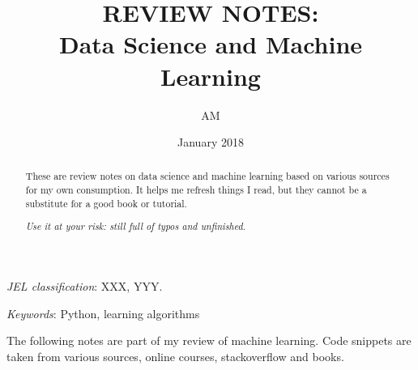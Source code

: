 \documentclass[11pt]{article}
\begin{document}


\title{REVIEW NOTES: \\
	Data Science and Machine Learning    
	}


\author{AM %
        }

\date{January 2018}  %


\renewcommand{\thefootnote}{\fnsymbol{footnote}}   

\singlespacing

\maketitle

\vspace{-.2in}
\begin{abstract}
\noindent These are review notes on data science and machine learning based on various sources for my own consumption. It helps me refresh things I read, but they cannot be a substitute for a good book or tutorial.

\centering\textit{Use it at your risk: still full of typos and unfinished.} 
\end{abstract}

\medskip

\noindent \textit{JEL classification}: XXX, YYY.

\medskip
\noindent \textit{Keywords}: Python, learning algorithms %

\clearpage

\tableofcontents

\thispagestyle{empty}

\clearpage

\onehalfspacing
\setcounter{footnote}{0}
\renewcommand{\thefootnote}{\arabic{footnote}}
\setcounter{page}{1}
The following notes are part of my review of machine learning. Code snippets are taken from various sources, online courses, stackoverflow and books. 
\end{document}
